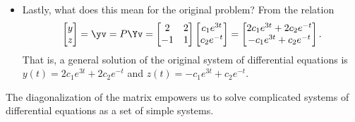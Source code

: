 \begin{itemize}
\item Lastly, what does this mean for the original problem?
From the relation
\begin{equation*}
\begin{bmatrix} y\\z \end{bmatrix}=\yv
=P\Yv=\begin{bmatrix} 2&2\\-1&1 \end{bmatrix}
\begin{bmatrix}c_1e^{3t}\\ c_2e^{-t} \end{bmatrix}
=\begin{bmatrix} 2c_1e^{3t}+2c_2e^{-t}
\\ -c_1e^{3t}+c_2e^{-t}\end{bmatrix}.
\end{equation*}
That is, a general solution of the original system of differential equations is \(y(t)=2c_1e^{3t}+2c_2e^{-t}\) and \(z(t)=-c_1e^{3t}+c_2e^{-t}\).

\end{itemize}
The diagonalization of the matrix empowers us to solve complicated systems of differential equations as a set of simple systems.


